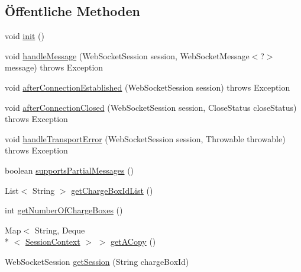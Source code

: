 \subsection*{Öffentliche Methoden}
\begin{DoxyCompactItemize}
\item 
void \hyperlink{classde_1_1rwth_1_1idsg_1_1steve_1_1ocpp_1_1ws_1_1_abstract_web_socket_endpoint_aef8362bd31120ca281b31b0e929b57d0}{init} ()
\item 
void \hyperlink{classde_1_1rwth_1_1idsg_1_1steve_1_1ocpp_1_1ws_1_1_abstract_web_socket_endpoint_af08f9d5fea93c492fa8a6e97f8131ccd}{handle\-Message} (Web\-Socket\-Session session, Web\-Socket\-Message$<$?$>$ message)  throws Exception 
\item 
void \hyperlink{classde_1_1rwth_1_1idsg_1_1steve_1_1ocpp_1_1ws_1_1_abstract_web_socket_endpoint_adc20166385a1af5646716aa0f6414f85}{after\-Connection\-Established} (Web\-Socket\-Session session)  throws Exception 
\item 
void \hyperlink{classde_1_1rwth_1_1idsg_1_1steve_1_1ocpp_1_1ws_1_1_abstract_web_socket_endpoint_aef2d9df6496b49e2981c3253760b2d69}{after\-Connection\-Closed} (Web\-Socket\-Session session, Close\-Status close\-Status)  throws Exception 
\item 
void \hyperlink{classde_1_1rwth_1_1idsg_1_1steve_1_1ocpp_1_1ws_1_1_abstract_web_socket_endpoint_a80a5c510b03fa4ce60c6642b9ad2c47d}{handle\-Transport\-Error} (Web\-Socket\-Session session, Throwable throwable)  throws Exception 
\item 
boolean \hyperlink{classde_1_1rwth_1_1idsg_1_1steve_1_1ocpp_1_1ws_1_1_abstract_web_socket_endpoint_ababd333016df11a6eb243cf87c27e329}{supports\-Partial\-Messages} ()
\item 
List$<$ String $>$ \hyperlink{classde_1_1rwth_1_1idsg_1_1steve_1_1ocpp_1_1ws_1_1_abstract_web_socket_endpoint_a8368ec501a410320c3725880bf79829e}{get\-Charge\-Box\-Id\-List} ()
\item 
int \hyperlink{classde_1_1rwth_1_1idsg_1_1steve_1_1ocpp_1_1ws_1_1_abstract_web_socket_endpoint_a863df404cd75c4804d6366076bef8b0a}{get\-Number\-Of\-Charge\-Boxes} ()
\item 
Map$<$ String, Deque\\*
$<$ \hyperlink{classde_1_1rwth_1_1idsg_1_1steve_1_1ocpp_1_1ws_1_1data_1_1_session_context}{Session\-Context} $>$ $>$ \hyperlink{classde_1_1rwth_1_1idsg_1_1steve_1_1ocpp_1_1ws_1_1_abstract_web_socket_endpoint_aef16fcbbf0c31be46115c81fc0738837}{get\-A\-Copy} ()
\item 
Web\-Socket\-Session \hyperlink{classde_1_1rwth_1_1idsg_1_1steve_1_1ocpp_1_1ws_1_1_abstract_web_socket_endpoint_afa20f380a780758a21d3bfa495987dfd}{get\-Session} (String charge\-Box\-Id)
\end{DoxyCompactItemize}
